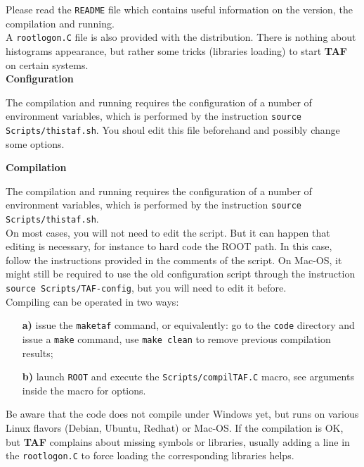 \documentclass[a4paper, 12pt, twoside]{article}
\newif\ifwithcomment
\newcommand{\comment}[1]{\ifwithcomment {\textcolor{blue}{\it#1}} \fi}
\newcommand{\TAF}{{\bf TAF }}
\begin{document}
\noindent
Please read the {\tt README} file which contains useful information on the version, the compilation and running.\\
A {\tt rootlogon.C} file is also provided with the distribution. There is nothing about histograms appearance, but rather some tricks (libraries loading) to start \TAF on certain systems.\\

\noindent
{\bf Configuration}

\noindent
The compilation and running requires the configuration of a number of environment variables, which is performed by the instruction {\tt source Scripts/thistaf.sh}. You shoul edit this file beforehand and possibly change some options.\\

\noindent
\comment{Preprocessor instructions have to be listed, {\tt Windows/LINUX, ROOT, ROOFIT, Minuit2...}.}

\noindent
{\bf Compilation}

\noindent
The compilation and running requires the configuration of a number of environment variables, which is performed by the instruction {\tt source Scripts/thistaf.sh}.\\
On most cases, you will not need to edit the script. But it can happen that editing is necessary, for instance to hard code the ROOT path. In this case, follow the instructions provided in the comments of the script. On Mac-OS, it might still be required to use the old configuration script through the instruction {\tt source Scripts/TAF-config}, but you will need to edit it before.\\

\noindent
Compiling can be operated in two ways:
\begin{itemize}
\item[{\bf a)}] issue the {\tt maketaf} command, or equivalently: go to the {\tt code} directory and issue a {\tt make} command, use {\tt make clean} to remove previous compilation results;
\item[{\bf b)}] launch {\tt ROOT} and execute the {\tt Scripts/compilTAF.C} macro, see arguments inside the macro for options.
\end{itemize}
Be aware that the code does not compile under Windows yet, but runs on various Linux flavors (Debian, Ubuntu, Redhat) or Mac-OS. If the compilation is OK, but \TAF complains about missing symbols or libraries, usually adding a line in the {\tt rootlogon.C} to force loading the corresponding libraries helps.
\end{document}
